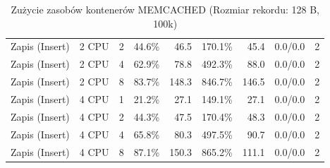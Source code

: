 \begin{table}[ht]
{\begin{tabular}{llcrrrrcc}
Zapis (Insert) & 2 CPU & 2 & 44.6\% & 46.5 & 170.1\% & 45.4 & 0.0/0.0 & 2 \\
Zapis (Insert) & 2 CPU & 4 & 62.9\% & 78.8 & 492.3\% & 88.0 & 0.0/0.0 & 2 \\
Zapis (Insert) & 2 CPU & 8 & 83.7\% & 148.3 & 846.7\% & 146.5 & 0.0/0.0 & 2 \\
Zapis (Insert) & 4 CPU & 1 & 21.2\% & 27.1 & 149.1\% & 27.1 & 0.0/0.0 & 2 \\
Zapis (Insert) & 4 CPU & 2 & 44.3\% & 47.5 & 170.4\% & 48.3 & 0.0/0.0 & 2 \\
Zapis (Insert) & 4 CPU & 4 & 65.8\% & 80.3 & 497.5\% & 90.7 & 0.0/0.0 & 2 \\
Zapis (Insert) & 4 CPU & 8 & 87.1\% & 150.3 & 865.2\% & 111.1 & 0.0/0.0 & 2 \\
\bottomrule
\end{tabular}%
}
\caption{Zużycie zasobów kontenerów MEMCACHED (Rozmiar rekordu: 128 B, 100k)}
\label{tab:resources_memcached_small_100000}
\end{table}
